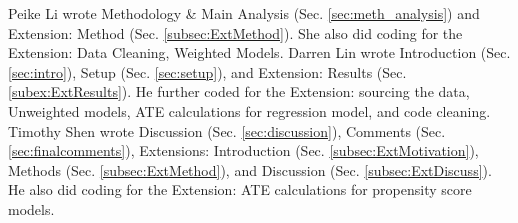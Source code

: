 \documentclass[12pt]{article}
\begin{document}
Peike Li wrote Methodology \& Main Analysis (Sec. \ref{sec:meth_analysis}) and Extension: Method (Sec. \ref{subsec:ExtMethod}). She also did coding for the Extension: Data Cleaning, Weighted Models. Darren Lin wrote Introduction (Sec. \ref{sec:intro}), Setup (Sec. \ref{sec:setup}), and Extension: Results (Sec. \ref{subex:ExtResults}). He further coded for the Extension: sourcing the data, Unweighted models, ATE calculations for regression model, and code cleaning. Timothy Shen wrote Discussion (Sec. \ref{sec:discussion}), Comments (Sec. \ref{sec:finalcomments}), Extensions: Introduction (Sec. \ref{subsec:ExtMotivation}), Methods (Sec. \ref{subsec:ExtMethod}), and Discussion (Sec. \ref{subsec:ExtDiscuss}).  He also did coding for the Extension: ATE calculations for propensity score models. 


\end{document}
